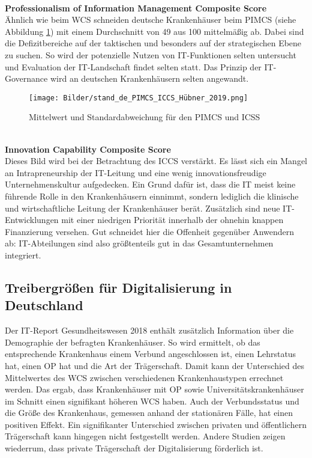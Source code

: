 \vspace{\parheadvspace}\\
\textbf{Professionalism of Information Management Composite Score}\\
Ähnlich wie beim WCS schneiden deutsche Krankenhäuser beim PIMCS (siehe Abbildung \ref{fig:stand_de_PIMCS_ICCS}) mit einem Durchschnitt von 49 aus 100 mittelmäßig ab. Dabei sind die Defizitbereiche auf der taktischen und besonders auf der strategischen Ebene zu suchen. So wird der potenzielle Nutzen von IT-Funktionen selten untersucht und Evaluation der IT-Landschaft findet selten statt. Das Prinzip der IT-Governance wird an deutschen Krankenhäusern selten angewandt.
\begin{figure}[ht]
	\centering
	\texttt{[image: Bilder/stand\_de\_PIMCS\_ICCS\_Hübner\_2019.png]}
	\caption{Mittelwert und Standardabweichung für den PIMCS und ICSS \parencite{huebner2019}}
	\label{fig:stand_de_PIMCS_ICCS}
\end{figure}
\vspace{\parheadvspace}\\
\textbf{Innovation Capability Composite Score}\\
Dieses Bild wird bei der Betrachtung des ICCS verstärkt. Es lässt sich ein Mangel an Intrapreneurship der IT-Leitung und eine wenig innovationsfreudige Unternehmenskultur aufgedecken. Ein Grund dafür ist, dass die IT meist keine führende Rolle in den Krankenhäusern einnimmt, sondern lediglich die klinische und wirtschaftliche Leitung der Krankenhäuser berät. Zusätzlich sind neue IT-Entwicklungen mit einer niedrigen Priorität innerhalb der ohnehin knappen Finanzierung versehen. Gut schneidet hier die Offenheit gegenüber Anwendern ab: IT-Abteilungen sind also größtenteils gut in das Gesamtunternehmen integriert.

\subsection{Treibergrößen für Digitalisierung in Deutschland}
Der IT-Report Gesundheitswesen 2018 enthält zusätzlich Information über die Demographie der befragten Krankenhäuser. So wird ermittelt, ob das entsprechende Krankenhaus einem Verbund angeschlossen ist, einen Lehrstatus hat, einen OP hat und die Art der Trägerschaft. Damit kann der Unterschied des Mittelwertes des WCS zwischen verschiedenen Krankenhaustypen errechnet werden. Das ergab, dass Krankenhäuser mit OP sowie Universitätskrankenhäuser im Schnitt einen signifikant höheren WCS haben. Auch der Verbundsstatus und die Größe des Krankenhaus, gemessen anhand der stationären Fälle, hat einen positiven Effekt. \parencite{huebner2019}
Ein signifikanter Unterschied zwischen privaten und öffentlichern Trägerschaft kann hingegen nicht festgestellt werden. Andere Studien \parencite{cresswell2013} zeigen wiederrum, dass private Trägerschaft der Digitalisierung förderlich ist.\\

